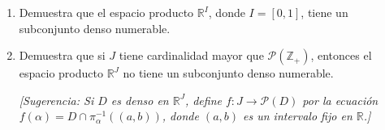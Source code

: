 \item 
    \begin{enumerate}
        \item Demuestra que el espacio producto $\mathbb{R}^{I}$, donde $I = [0,1]$, tiene un subconjunto denso numerable.
        \item Demuestra que si $J$ tiene cardinalidad mayor que $\mathcal{P}(\mathbb{Z}_{+})$, entonces el espacio producto $\mathbb{R}^{J}$ no tiene un subconjunto denso numerable.  
        
        \textit{[Sugerencia: Si $D$ es denso en $\mathbb{R}^{J}$, define $f: J \to \mathcal{P}(D)$ por la ecuación $f(\alpha) = D \cap \pi_{\alpha}^{-1}((a,b))$, donde $(a,b)$ es un intervalo fijo en $\mathbb{R}$.]}
    \end{enumerate}

  